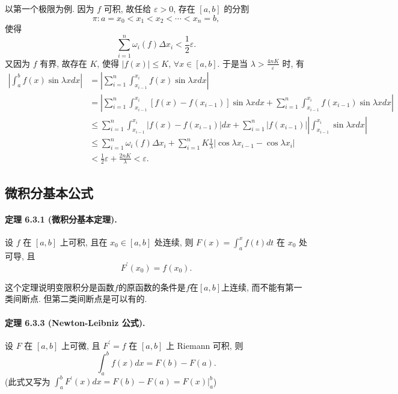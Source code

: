 以第一个极限为例. 因为 $f$ 可积, 故任给 $\varepsilon>0$, 存在 $[a,b]$ 的分割 
\[
\pi:a=x_{0}<x_{1}<x_{2}<\cdots<x_{n}=b,
\]
使得 
\[
\sum_{i=1}^{n}\omega_{i}(f)\Delta x_{i}<\frac{1}{2}\varepsilon.
\]
又因为 $f$ 有界, 故存在 $K$, 使得 $|f(x)|\leqslant K$, $\forall x\in[a,b]$.
于是当 $\lambda>\frac{4nK}{\varepsilon}$ 时, 有 
\[
\begin{aligned}\left|\int_{a}^{b}f(x)\sin\lambda xdx\right| & =\left|\sum_{i=1}^{n}\int_{x_{i-1}}^{x_{i}}f(x)\sin\lambda xdx\right|\\
	& =\left|\sum_{i=1}^{n}\int_{x_{i-1}}^{x_{i}}\left[f(x)-f\left(x_{i-1}\right)\right]\sin\lambda xdx+\sum_{i=1}^{n}\int_{x_{i-1}}^{x_{i}}f\left(x_{i-1}\right)\sin\lambda xdx\right|\\
	& \leqslant\sum_{i=1}^{n}\int_{x_{i-1}}^{x_{i}}\left|f(x)-f\left(x_{i-1}\right)\right|dx+\sum_{i=1}^{n}\left|f\left(x_{i-1}\right)\right|\left|\int_{x_{i-1}}^{x_{i}}\sin\lambda xdx\right|\\
	& \leqslant\sum_{i=1}^{n}\omega_{i}(f)\Delta x_{i}+\sum_{i=1}^{n}K\frac{1}{\lambda}\left|\cos\lambda x_{i-1}-\cos\lambda x_{i}\right|\\
	& <\frac{1}{2}\varepsilon+\frac{2nK}{\lambda}<\varepsilon.
\end{aligned}
\]


\subsection{微积分基本公式}

\paragraph{定理 6.3.1 (微积分基本定理). }

设 $f$ 在 $[a,b]$ 上可积, 且在 $x_{0}\in[a,b]$ 处连续, 则 $F(x)=\int_{a}^{x}f(t)dt$
在 $x_{0}$ 处可导, 且 
\[
F^{\prime}\left(x_{0}\right)=f\left(x_{0}\right).
\]

这个定理说明变限积分是函数$f$的原函数的条件是$f$在$[a,b]$上连续, 而不能有第一类间断点. 但第二类间断点是可以有的.

\paragraph{定理 6.3.3 (Newton-Leibniz 公式). }

设 $F$ 在 $[a,b]$ 上可微, 且 $F^{\prime}=f$ 在 $[a,b]$ 上 Riemann 可积,
则 
\[
\int_{a}^{b}f(x)dx=F(b)-F(a).
\]
(此式又写为 $\int_{a}^{b}F^{\prime}(x)dx=F(b)-F(a)=\left.F(x)\right|_{a}^{b}$)

